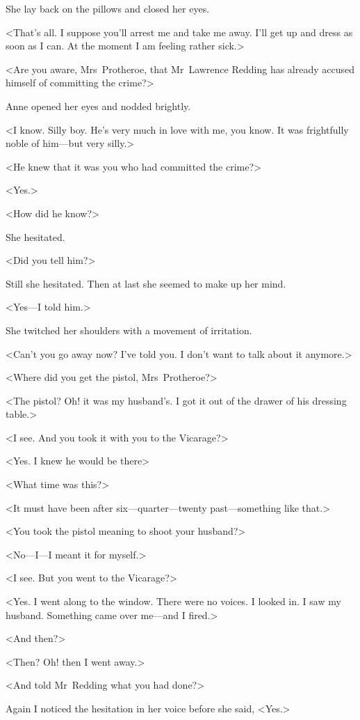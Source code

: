 She lay back on the pillows and closed her eyes.

<That's all. I suppose you'll arrest me and take me away. I'll get up and dress as soon as I can. At the moment I am feeling rather sick.>

<Are you aware, Mrs~Protheroe, that Mr~Lawrence Redding has already accused himself of committing the crime?>

Anne opened her eyes and nodded brightly.

<I know. Silly boy. He's very much in love with me, you know. It was frightfully noble of him—but very silly.>

<He knew that it was you who had committed the crime?>

<Yes.>

<How did he know?>

She hesitated.

<Did you tell him?>

Still she hesitated. Then at last she seemed to make up her mind.

<Yes—I told him.>

She twitched her shoulders with a movement of irritation.

<Can't you go away now? I've told you. I don't want to talk about it anymore.>

<Where did you get the pistol, Mrs~Protheroe?>

<The pistol? Oh! it was my husband's. I got it out of the drawer of his dressing table.>

<I see. And you took it with you to the Vicarage?>

<Yes. I knew he would be there\longdash>

<What time was this?>

<It must have been after six—quarter—twenty past—something like that.>

<You took the pistol meaning to shoot your husband?>

<No—I—I meant it for myself.>

<I see. But you went to the Vicarage?>

<Yes. I went along to the window. There were no voices. I looked in. I saw my husband. Something came over me—and I fired.>

<And then?>

<Then? Oh! then I went away.>

<And told Mr~Redding what you had done?>

Again I noticed the hesitation in her voice before she said, <Yes.>


